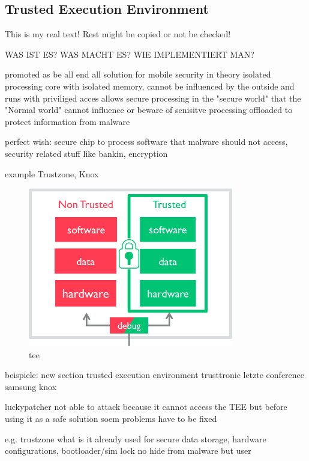 \subsection{Trusted Execution Environment} \label{subsection:counter-external-tee}
This is my real text! Rest might be copied or not be checked!

WAS IST ES?
WAS MACHT ES?
WIE IMPLEMENTIERT MAN?

%
promoted as be all end all solution for mobile security
in theory isolated processing core with isolated memory, cannot be influenced by the outside and runs with priviliged acces
allows secure processing in the "secure world" that the "Normal world" cannot influence or beware of
senisitve processing offloaded to protect information from malware

perfect wish:
secure chip to process software that malware should not access, security related stuff like bankin, encryption

example Trustzone, Knox
\begin{figure}[h]
    \centering
    \includegraphics[width=0.8\textwidth]{data/tee.png}
    \caption{tee \cite{armTz}}
    \label{fig:tee}
\end{figure}


\cite{dragonTZ}\cite{armTz}
%



beispiele:
new section trusted execution environment
trusttronic letzte conference
samsung knox


luckypatcher not able to attack because it cannot access the TEE but before using it as a safe solution soem problems have to be fixed

%
e.g. trustzone
what is it already used for
secure data storage, hardware configurations, bootloader/sim lock
no hide from malware but user

